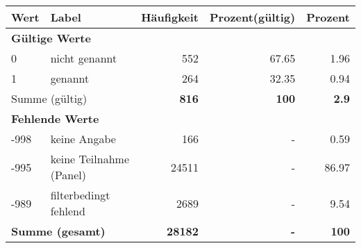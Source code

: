      \begin{longtable}{lXrrr}
     \toprule
     \textbf{Wert} & \textbf{Label} & \textbf{Häufigkeit} & \textbf{Prozent(gültig)} & \textbf{Prozent} \\
     \endhead
     \midrule
     \multicolumn{5}{l}{\textbf{Gültige Werte}}\\

     0 &
     \multicolumn{1}{X}{ nicht genannt   } &


       \num{552} &
       \num[round-mode=places,round-precision=2]{67,65} &
         \num[round-mode=places,round-precision=2]{1,96} \\

     1 &
     \multicolumn{1}{X}{ genannt   } &


       \num{264} &
       \num[round-mode=places,round-precision=2]{32,35} &
         \num[round-mode=places,round-precision=2]{0,94} \\
     \midrule
     \multicolumn{2}{l}{Summe (gültig)} &
       \textbf{\num{816}} &
     \textbf{100} &
       \textbf{\num[round-mode=places,round-precision=2]{2,9}} \\
     \multicolumn{5}{l}{\textbf{Fehlende Werte}}\\
       -998 &
       keine Angabe &
         \num{166} &
        - &
         \num[round-mode=places,round-precision=2]{0,59} \\
       -995 &
       keine Teilnahme (Panel) &
         \num{24511} &
        - &
         \num[round-mode=places,round-precision=2]{86,97} \\
       -989 &
       filterbedingt fehlend &
         \num{2689} &
        - &
         \num[round-mode=places,round-precision=2]{9,54} \\
     \midrule
     \multicolumn{2}{l}{\textbf{Summe (gesamt)}} &
          \textbf{\num{28182}} &
        \textbf{-} &
        \textbf{100} \\
     \bottomrule
     \end{longtable}
     
